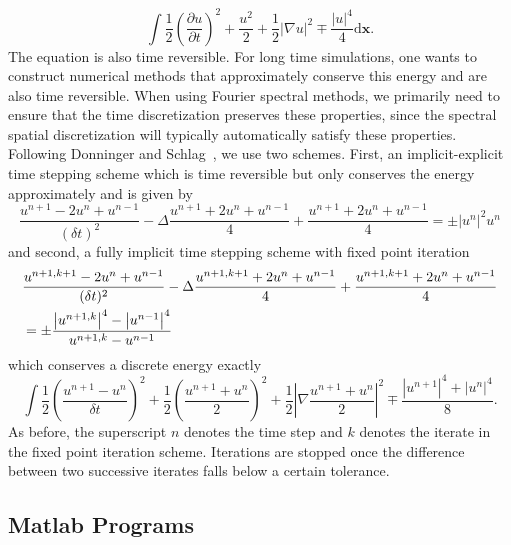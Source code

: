 \begin{equation}
\int  \frac{1}{2}\left( \frac{\partial u}{\partial t}\right)^2 + \frac{u^2}{2}+\frac{1}{2}\left\lvert \nabla u \right\rvert^2 \mp \frac{\left\lvert u \right\rvert^4}{4} \mathrm{d}\bm x.
\end{equation}
The equation is also time reversible. For long time simulations, one wants to construct numerical methods that approximately conserve this energy and are also time reversible. When using Fourier spectral methods, we primarily need to ensure that the time discretization preserves these properties, since the spectral spatial discretization will typically automatically satisfy these properties. Following Donninger and Schlag~\cite{DonSch11}, we use two schemes. First, an implicit-explicit time stepping scheme which is time reversible but only conserves the energy approximately and is given by
\begin{equation}\label{eq:KgImEx}
\frac{u^{n+1}-2u^n+u^{n-1}}{(\delta t)^2} -\Delta \frac{u^{n+1}+2u^n+u^{n-1}}{4} + \frac{u^{n+1}+2u^n+u^{n-1}}{4} = \pm \left\lvert u^{n}\right\rvert^2u^n
\end{equation}
and second, a fully implicit time stepping scheme with fixed point iteration 
\begin{align}\label{eq:KgImp}
&{}\frac{u^{n+1,k+1}-2u^n+u^{n-1}}{(\delta t)^2} -\Delta \frac{u^{n+1,k+1}+2u^n+u^{n-1}}{4} + \frac{u^{n+1,k+1}+2u^n+u^{n-1}}{4} \notag
\\&{} = \pm \frac{\left\lvert u^{n+1,k}\right\rvert^4-\left\lvert u^{n-1}\right\rvert^4}{u^{n+1,k}-u^{n-1}}
\end{align}
which conserves a discrete energy exactly
\begin{equation}\label{eq:KgImEn}
\int\frac{1}{2}\left(\frac{u^{n+1}-u^n}{\delta t}\right)^2 + \frac{1}{2}\left(\frac{u^{n+1}+u^n}{2}\right)^2+\frac{1}{2}\left\lvert\nabla\frac{u^{n+1}+u^n}{2}\right\rvert^2 \mp \frac{\left\lvert{u}^{n+1}\right\rvert^4+\left\lvert{u}^{n}\right\rvert^4}{8}.
\end{equation}
As before, the superscript $n$ denotes the time step and $k$ denotes the iterate in the fixed point iteration scheme. Iterations are stopped once the difference between two successive iterates falls below a certain tolerance. 

\subsection{Matlab Programs}

